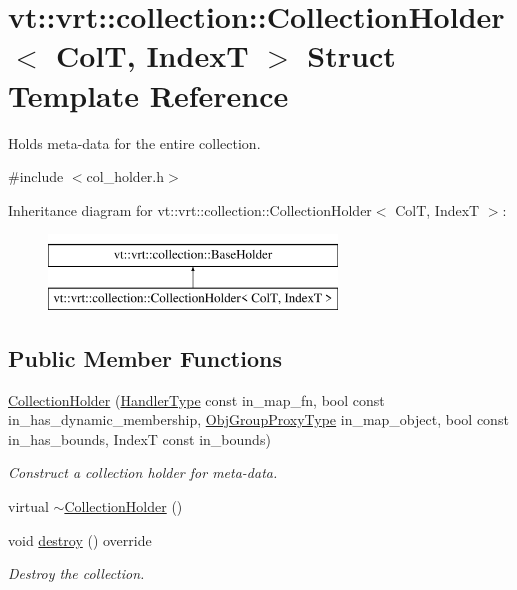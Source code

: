 \hypertarget{structvt_1_1vrt_1_1collection_1_1_collection_holder}{}\section{vt\+:\+:vrt\+:\+:collection\+:\+:Collection\+Holder$<$ ColT, IndexT $>$ Struct Template Reference}
\label{structvt_1_1vrt_1_1collection_1_1_collection_holder}


Holds meta-\/data for the entire collection.  




{\ttfamily \#include $<$col\+\_\+holder.\+h$>$}

Inheritance diagram for vt\+:\+:vrt\+:\+:collection\+:\+:Collection\+Holder$<$ ColT, IndexT $>$\+:\begin{figure}[H]
\begin{center}
\leavevmode
\includegraphics[height=2.000000cm]{structvt_1_1vrt_1_1collection_1_1_collection_holder}
\end{center}
\end{figure}
\subsection*{Public Member Functions}
\begin{DoxyCompactItemize}
\item 
\hyperlink{structvt_1_1vrt_1_1collection_1_1_collection_holder_a16fed674b4195fcf084c61dfe7921c7c}{Collection\+Holder} (\hyperlink{namespacevt_af64846b57dfcaf104da3ef6967917573}{Handler\+Type} const in\+\_\+map\+\_\+fn, bool const in\+\_\+has\+\_\+dynamic\+\_\+membership, \hyperlink{namespacevt_ad7cae989df485fccca57f0792a880a8e}{Obj\+Group\+Proxy\+Type} in\+\_\+map\+\_\+object, bool const in\+\_\+has\+\_\+bounds, IndexT const in\+\_\+bounds)
\begin{DoxyCompactList}\small\item\em Construct a collection holder for meta-\/data. \end{DoxyCompactList}\item 
virtual \hyperlink{structvt_1_1vrt_1_1collection_1_1_collection_holder_a80360d38dc40e4bf2253288b01595de6}{$\sim$\+Collection\+Holder} ()
\item 
void \hyperlink{structvt_1_1vrt_1_1collection_1_1_collection_holder_a744d2a48f9f22db59b2705b3d3f3d1ca}{destroy} () override
\begin{DoxyCompactList}\small\item\em Destroy the collection. \end{DoxyCompactList}\end{DoxyCompactItemize}
